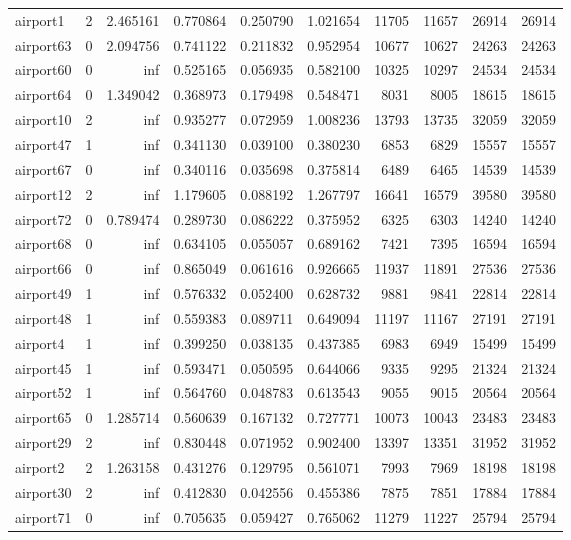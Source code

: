 \begin{longtable}{|l|r|r|r|r|r|r|r|r|r|}
airport1 & 2 & 2.465161 & 0.770864 & 0.250790 & 1.021654 & 11705 & 11657 & 26914 & 26914 \\
airport63 & 0 & 2.094756 & 0.741122 & 0.211832 & 0.952954 & 10677 & 10627 & 24263 & 24263 \\
airport60 & 0 & inf & 0.525165 & 0.056935 & 0.582100 & 10325 & 10297 & 24534 & 24534 \\
airport64 & 0 & 1.349042 & 0.368973 & 0.179498 & 0.548471 & 8031 & 8005 & 18615 & 18615 \\
airport10 & 2 & inf & 0.935277 & 0.072959 & 1.008236 & 13793 & 13735 & 32059 & 32059 \\
airport47 & 1 & inf & 0.341130 & 0.039100 & 0.380230 & 6853 & 6829 & 15557 & 15557 \\
airport67 & 0 & inf & 0.340116 & 0.035698 & 0.375814 & 6489 & 6465 & 14539 & 14539 \\
airport12 & 2 & inf & 1.179605 & 0.088192 & 1.267797 & 16641 & 16579 & 39580 & 39580 \\
airport72 & 0 & 0.789474 & 0.289730 & 0.086222 & 0.375952 & 6325 & 6303 & 14240 & 14240 \\
airport68 & 0 & inf & 0.634105 & 0.055057 & 0.689162 & 7421 & 7395 & 16594 & 16594 \\
airport66 & 0 & inf & 0.865049 & 0.061616 & 0.926665 & 11937 & 11891 & 27536 & 27536 \\
airport49 & 1 & inf & 0.576332 & 0.052400 & 0.628732 & 9881 & 9841 & 22814 & 22814 \\
airport48 & 1 & inf & 0.559383 & 0.089711 & 0.649094 & 11197 & 11167 & 27191 & 27191 \\
airport4 & 1 & inf & 0.399250 & 0.038135 & 0.437385 & 6983 & 6949 & 15499 & 15499 \\
airport45 & 1 & inf & 0.593471 & 0.050595 & 0.644066 & 9335 & 9295 & 21324 & 21324 \\
airport52 & 1 & inf & 0.564760 & 0.048783 & 0.613543 & 9055 & 9015 & 20564 & 20564 \\
airport65 & 0 & 1.285714 & 0.560639 & 0.167132 & 0.727771 & 10073 & 10043 & 23483 & 23483 \\
airport29 & 2 & inf & 0.830448 & 0.071952 & 0.902400 & 13397 & 13351 & 31952 & 31952 \\
airport2 & 2 & 1.263158 & 0.431276 & 0.129795 & 0.561071 & 7993 & 7969 & 18198 & 18198 \\
airport30 & 2 & inf & 0.412830 & 0.042556 & 0.455386 & 7875 & 7851 & 17884 & 17884 \\
airport71 & 0 & inf & 0.705635 & 0.059427 & 0.765062 & 11279 & 11227 & 25794 & 25794 \\

\end{longtable}
